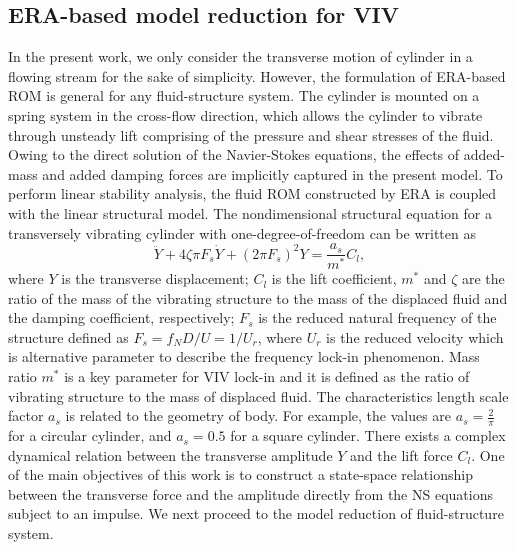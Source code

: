 \documentclass{jfm}
\begin{document}
\subsection{ERA-based model reduction for VIV}
In the present work, we only consider the transverse motion of cylinder in a flowing stream for the sake of simplicity.
However, the formulation of ERA-based ROM is general for any fluid-structure system.
%
The cylinder is mounted on a spring system in the cross-flow direction, 
which allows the cylinder to vibrate through unsteady lift comprising 
of the pressure and shear stresses of the fluid. Owing to the direct solution of 
the Navier-Stokes equations, the effects of added-mass and added damping forces are 
implicitly captured in the present model.
%
To perform linear stability analysis, the fluid ROM constructed by ERA is coupled with 
the linear structural model. 
The nondimensional structural equation for a transversely vibrating cylinder with 
one-degree-of-freedom can be written as  
\begin{equation}
{\ddot{Y} + 4\zeta\pi F_{s}\dot{Y} + (2\pi F_{s})^2 Y}=\frac{a_{s}}{m^{*}} C_{l},
\label{eq:structure1}
\end{equation}
where $Y$ is the transverse displacement; $C_{l}$ is the lift coefficient, 
$m^{*}$ and $\zeta$ are the ratio of the mass of the vibrating structure to the mass of the displaced fluid and the 
damping coefficient, respectively; $F_{s}$ is the reduced natural frequency of the structure 
defined as $F_{s}=f_{N}D/U = 1/U_r$, where $U_r$ is the reduced velocity which
is alternative parameter to describe the frequency lock-in phenomenon. 
Mass ratio $m^*$ is a key parameter for VIV lock-in and it is 
defined as the ratio of vibrating structure  to the mass of displaced fluid.
%
The characteristics length scale factor  $a_{s}$ 
is related to the geometry of body. For example, the values are 
$a_{s}=\frac{2}{\pi}$ for a circular cylinder, and  $a_{s}=0.5$ 
for a square cylinder. There exists a complex dynamical relation between 
the transverse amplitude $Y$ and the lift force $C_{l}$. 
%
One of the main objectives of this work is to construct a state-space relationship between 
the transverse force and the amplitude directly from the 
NS equations subject to an impulse. We next proceed to the model reduction
of fluid-structure system.
\end{document}
